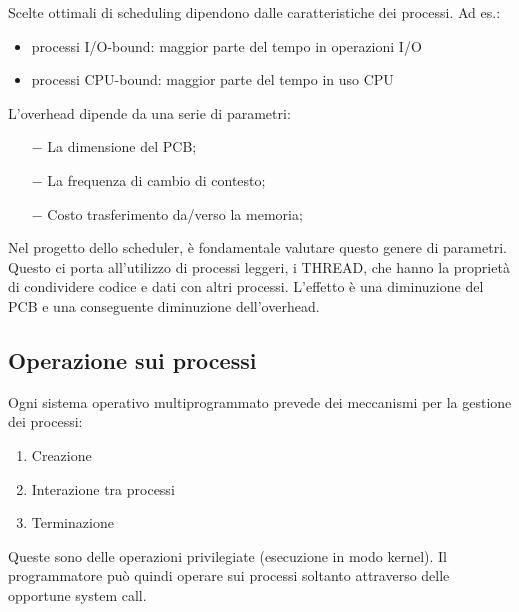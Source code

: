 \documentclass{article}
\begin{document}
Scelte ottimali di scheduling dipendono dalle caratteristiche dei processi. 
Ad es.:\begin{itemize}
    \item processi I/O-bound: maggior parte del tempo in operazioni I/O
    \item processi CPU-bound: maggior parte del tempo in uso CPU
\end{itemize}
\medskip

\noindent{}
\medskip

\noindent L'overhead dipende da una serie di parametri:\begin{itemize}
    \item[$-$] La dimensione del PCB;
    \item[$-$] La frequenza di cambio di contesto;
    \item[$-$] Costo trasferimento da/verso la memoria;
\end{itemize}
    
\noindent Nel progetto dello scheduler, è fondamentale valutare questo genere di 
parametri. Questo ci porta all'utilizzo di processi leggeri, i THREAD,
che hanno la proprietà di condividere codice e dati con altri processi.
L'effetto è una diminuzione del PCB e una conseguente diminuzione 
dell'overhead.

\subsection{Operazione sui processi}
Ogni sistema operativo multiprogrammato prevede dei meccanismi per 
la gestione dei processi:
\begin{enumerate}
    \item Creazione
    \item Interazione tra processi
    \item Terminazione
\end{enumerate}
\noindent Queste sono delle operazioni privilegiate 
(esecuzione in modo kernel). Il programmatore può quindi operare sui
processi soltanto attraverso delle opportune system call.
\end{document}
